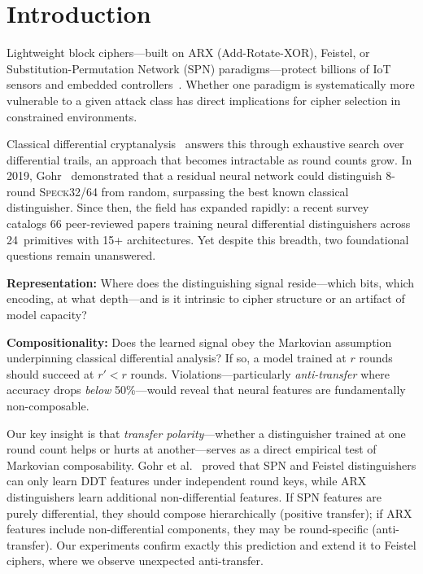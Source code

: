 \documentclass[runningheads]{llncs}
\newcommand{\speck}{\textsc{Speck32/64}\xspace}
\begin{document}

\section{Introduction}
\label{sec:intro}

Lightweight block ciphers---built on ARX (Add-Rotate-XOR), Feistel, or Substitution-Permutation Network (SPN) paradigms---protect billions of IoT sensors and embedded controllers~\cite{bogdanov2007present,beaulieu2015simon}.
Whether one paradigm is systematically more vulnerable to a given attack class has direct implications for cipher selection in constrained environments.

Classical differential cryptanalysis~\cite{biham1991differential} answers this through exhaustive search over differential trails, an approach that becomes intractable as round counts grow.
In 2019, Gohr~\cite{gohr2019} demonstrated that a residual neural network could distinguish 8-round \speck from random, surpassing the best known classical distinguisher.
Since then, the field has expanded rapidly: a recent survey~\cite{gerault2024sok} catalogs 66 peer-reviewed papers training neural differential distinguishers across 24~primitives with 15+ architectures.
Yet despite this breadth, two foundational questions remain unanswered.

\textbf{Representation:} Where does the distinguishing signal reside---which bits, which encoding, at what depth---and is it intrinsic to cipher structure or an artifact of model capacity?

\textbf{Compositionality:} Does the learned signal obey the Markovian assumption underpinning classical differential analysis?
If so, a model trained at $r$ rounds should succeed at $r' < r$ rounds.
Violations---particularly \emph{anti-transfer} where accuracy drops \emph{below} 50\%---would reveal that neural features are fundamentally non-composable.

Our key insight is that \emph{transfer polarity}---whether a distinguisher trained at one round count helps or hurts at another---serves as a direct empirical test of Markovian composability.
Gohr et al.~\cite{gohr2022assessment} proved that SPN and Feistel distinguishers can only learn DDT features under independent round keys, while ARX distinguishers learn additional non-differential features.
If SPN features are purely differential, they should compose hierarchically (positive transfer); if ARX features include non-differential components, they may be round-specific (anti-transfer).
Our experiments confirm exactly this prediction and extend it to Feistel ciphers, where we observe unexpected anti-transfer.
\end{document}

